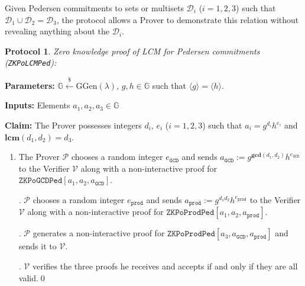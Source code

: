 \documentclass[11pt, lettersize, notitlepage, leqno, footskip=0.6cm]{article}
\newcommand{\ttt}{\texttt}
\newcommand{\la}{\langle}
\newcommand{\ra}{\rangle}
\newcommand{\mc}{\mathcal}
\newcommand{\mb}{\mathbb}
\newcommand{\mbf}{\mathbf}
\newcommand{\mr}{\mathrm}
\newcommand{\lamb}{\lambda}
\newcommand{\mP}{\mc{P}}
\newcommand{\V}{\mc{V}}
\newcommand{\vs}{\vspace{-0.15cm}}
\newcommand{\noin}{\noindent}
\newcommand{\LCM}{\mbf{lcm}}
\newcommand{\GCD}{\mbf{gcd}}
\newtheorem{Prot}[Thm]{Protocol}
\numberwithin{equation}{section}
\begin{document}
{{{Given Pedersen commitments to sets or multisets $\mc{D}_i$ ($i=1,2,3$) such that $\mc{D}_1\cup \mc{D}_2 = \mc{D}_3$, the protocol allows a Prover to demonstrate this relation without revealing anything about the $\mc{D}_i$.



\begin{Prot} \normalfont \hypertarget{PoLCMPed}{\textit{Zero knowledge proof of LCM for Pedersen commitments}} (\verb|ZKPoLCMPed|):\end{Prot} \vspace{-0.3cm}

\noin \textbf{Parameters:} $\mb{G}\xleftarrow{\$} \mr{GGen}(\lamb)$,  $g,h\in \mb{G}$ such that $\la g \ra = \la h \ra$.

\noin \textbf{Inputs:} Elements $a_1,a_2,a_3\in \mb{G}$

\noin \textbf{Claim:} The Prover possesses integers $d_i$, $e_i$ ($i=1,2,3$) such that $a_i = g^{d_i}h^{e_i}$ and $\LCM(d_1,d_2) = d_3$.

\begin{enumerate}[wide, labelwidth=!, labelindent=0pt]\vs \item The Prover $\mP$ chooses a random integer $e_{\ttt{GCD}}$ and sends $a_{\ttt{GCD}}:= g^{\GCD(d_1,d_2)}h^{e_{\ttt{GCD}}}$ to the Verifier $\V$ along with a non-interactive proof for $\ttt{ZKPoGCDPed}[a_1,a_2,a_{\ttt{GCD}}]$.

\noin 2. $\mP$ chooses a random integer $e_{\ttt{prod}}$ and sends $a_{\ttt{prod}}:= g^{d_1d_2}h^{e_{\ttt{prod}}}$ to the Verifier $\V$ along with a non-interactive proof for $\ttt{ZKPoProdPed}[a_1,a_2,a_{\ttt{prod}}]$.

\noin 3. $\mP$ generates a non-interactive proof for $\ttt{ZKPoProdPed}[a_3,a_{\ttt{GCD}}, a_{\ttt{prod}}]$ and sends it to $\V$.

\noin 4. $\V$ verifies the three proofs he receives and accepts if and only if they are all valid.\qed \end{enumerate}

 






\begin{comment}

# Shrouded Socket

Take Home Test

## Rules



We care about clean code, comments documenting assumptions/design choices/edge cases/..., and maybe even some tests. :-) 
Please make sure to document how to compile and run your code.


\end{comment}}}}
\end{document}
